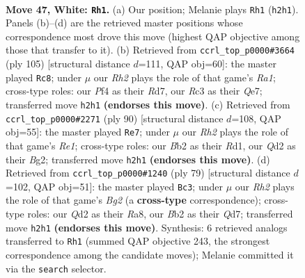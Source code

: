 \documentclass[11pt]{article}
\begin{document}
\clearpage

\begin{figure}[p]\centering
\begin{subfigure}{0.46\textwidth}\centering
\resizebox{\linewidth}{!}{%
\newchessgame
\chessboard[
  setfen={rn1qk2r/4n1b1/2p3p1/3p2P1/3P1P1p/1PR4P/1BNQBK1R/8 w - - 23 47},
  showmover=false,
  pgfstyle=straightmove, color=movearrow, markmove={h2-h1}
]}
\caption{}
\end{subfigure}\hfill
\begin{subfigure}{0.46\textwidth}\centering
\resizebox{\linewidth}{!}{%
\newchessgame
\chessboard[
  setfen={r5k1/3rqp2/1pbpn1p1/7p/1PP1Pp1P/1B1R1N2/3Q1PP1/4R1K1 b - - 36 53},
  showmover=false,
  pgfstyle=straightmove, color=movearrow, markmove={a8-c8}
]}
\caption{}
\end{subfigure}
\\[4pt]
\begin{subfigure}{0.46\textwidth}\centering
\resizebox{\linewidth}{!}{%
\newchessgame
\chessboard[
  setfen={1nr2nqk/1b4p1/5r1p/pN1P1p1P/P4P2/1P1Q2P1/6B1/3RR1K1 w - - 3 46},
  showmover=false,
  pgfstyle=straightmove, color=movearrow, markmove={e1-e7}
]}
\caption{}
\end{subfigure}\hfill
\begin{subfigure}{0.46\textwidth}\centering
\resizebox{\linewidth}{!}{%
\newchessgame
\chessboard[
  setfen={r3r1k1/3q1pb1/1n1p3p/p1pP4/4PN2/RP2P1P1/R2N2K1/5Q2 b - - 0 40},
  showmover=false,
  pgfstyle=straightmove, color=movearrow, markmove={g7-c3}
]}
\caption{}
\end{subfigure}
\caption{\textbf{Move 47, White: \texttt{Rh1}.} (a) Our position; Melanie plays \texttt{Rh1} (\texttt{h2h1}). Panels (b)--(d) are the retrieved master positions whose correspondence most drove this move (highest QAP objective among those that transfer to it). (b) Retrieved from \texttt{ccrl\_top\_p0000\#3664} (ply 105) [structural distance $d$=111, QAP obj=60]: the master played \texttt{Rc8}; under $\mu$ our \emph{Rh2} plays the role of that game's \emph{Ra1}; cross-type roles: our \emph{P}f4 as their \emph{R}d7, our \emph{R}c3 as their \emph{Q}e7; transferred move \texttt{h2h1} \textbf{(endorses this move)}. (c) Retrieved from \texttt{ccrl\_top\_p0000\#2271} (ply 90) [structural distance $d$=108, QAP obj=55]: the master played \texttt{Re7}; under $\mu$ our \emph{Rh2} plays the role of that game's \emph{Re1}; cross-type roles: our \emph{B}b2 as their \emph{R}d1, our \emph{Q}d2 as their \emph{B}g2; transferred move \texttt{h2h1} \textbf{(endorses this move)}. (d) Retrieved from \texttt{ccrl\_top\_p0000\#1240} (ply 79) [structural distance $d$=102, QAP obj=51]: the master played \texttt{Bc3}; under $\mu$ our \emph{Rh2} plays the role of that game's \emph{Bg2} (a \textbf{cross-type} correspondence); cross-type roles: our \emph{Q}d2 as their \emph{R}a8, our \emph{B}b2 as their \emph{Q}d7; transferred move \texttt{h2h1} \textbf{(endorses this move)}. Synthesis: 6 retrieved analogs transferred to \texttt{Rh1} (summed QAP objective 243, the strongest correspondence among the candidate moves); Melanie committed it via the \texttt{search} selector.}
\label{fig:thought-m92}
\end{figure}
\end{document}
